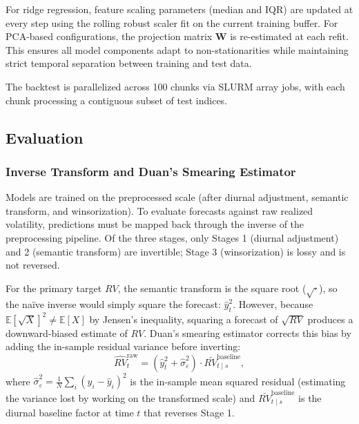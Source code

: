 For ridge regression, feature scaling parameters (median and IQR) are updated at every step using the rolling robust scaler fit on the current training buffer. For PCA-based configurations, the projection matrix $\mathbf{W}$ is re-estimated at each refit. This ensures all model components adapt to non-stationarities while maintaining strict temporal separation between training and test data.

The backtest is parallelized across 100 chunks via SLURM array jobs, with each chunk processing a contiguous subset of test indices.

\subsection{Evaluation}
\label{sec:evaluation}

\subsubsection{Inverse Transform and Duan's Smearing Estimator}
\label{sec:duan}

Models are trained on the preprocessed scale (after diurnal adjustment, semantic transform, and winsorization). To evaluate forecasts against raw realized volatility, predictions must be mapped back through the inverse of the preprocessing pipeline. Of the three stages, only Stages 1 (diurnal adjustment) and 2 (semantic transform) are invertible; Stage 3 (winsorization) is lossy and is not reversed.

For the primary target $RV$, the semantic transform is the square root ($\sqrt{\cdot}$), so the na\"ive inverse would simply square the forecast: $\hat{y}_t^2$. However, because $\mathbb{E}[\sqrt{X}]^2 \neq \mathbb{E}[X]$ by Jensen's inequality, squaring a forecast of $\sqrt{RV}$ produces a downward-biased estimate of $RV$. Duan's smearing estimator \citep{Duan1983} corrects this bias by adding the in-sample residual variance before inverting:
\begin{equation}
    \widehat{RV}_t^{\mathrm{raw}} = \left(\hat{y}_t^2 + \hat{\sigma}_{\varepsilon}^2\right) \cdot \bar{RV}_{t \mid s}^{\mathrm{baseline}},
    \label{eq:duan}
\end{equation}
where $\hat{\sigma}_{\varepsilon}^2 = \frac{1}{N}\sum_{i}(y_i - \hat{y}_i)^2$ is the in-sample mean squared residual (estimating the variance lost by working on the transformed scale) and $\bar{RV}_{t \mid s}^{\mathrm{baseline}}$ is the diurnal baseline factor at time $t$ that reverses Stage 1.


